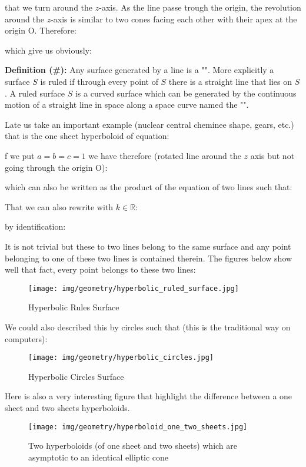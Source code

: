 {	that we turn around the $z$-axis. As the line passe trough the origin, the revolution around the $z$-axis is similar to two cones facing each other with their apex at the origin O. Therefore:
	
	which give us obviously:
	
	\textbf{Definition (\#\mydef):} Any surface generated by a line is a "". More explicitly a surface $S$ is ruled if through every point of $S$ there is a straight line that lies on $S$. A ruled surface $S$ is a curved surface which can be generated by the continuous motion of a straight line in space along a space curve named the "".
	
	Late us take an important example (nuclear central cheminee shape, gears, etc.) that is the one sheet hyperboloid of equation:
	
	f we put $a=b=c=1$ we have therefore (rotated line around the $z$ axis but not going through the origin O):
	
	which can also be written as the product of the equation of two lines such that:
	
	That we can also rewrite with $k \in \mathbb{R}$:
	
	by identification:
	
	It is not trivial but these to two lines belong to the same surface and any point belonging to one of these two lines is contained therein. The figures below show well that fact, every point belongs to these two lines:
	\begin{figure}[H]
		\centering
		\texttt{[image: img/geometry/hyperbolic\_ruled\_surface.jpg]}
		\caption{Hyperbolic Rules Surface}
	\end{figure}
	We could also described this by circles such that (this is the traditional way on computers):
	
	\begin{figure}[H]
		\centering
		\texttt{[image: img/geometry/hyperbolic\_circles.jpg]}
		\caption{Hyperbolic Circles Surface}
	\end{figure}
	Here is also a very interesting figure that highlight the difference between a one sheet and two sheets hyperboloids\label{two sheets hyperboloid}.
	\begin{figure}[H]
		\centering
		\texttt{[image: img/geometry/hyperboloid\_one\_two\_sheets.jpg]}
		\caption{Two hyperboloids (of one sheet and two sheets) which are asymptotic to an identical elliptic cone}
	\end{figure}
	
}
